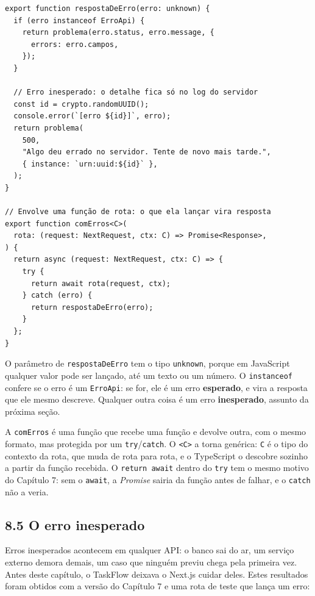 \begin{codigo}
\begin{Verbatim}[breaklines=true, breaksymbolleft={}, fontsize=\footnotesize]
export function respostaDeErro(erro: unknown) {
  if (erro instanceof ErroApi) {
    return problema(erro.status, erro.message, {
      errors: erro.campos,
    });
  }

  // Erro inesperado: o detalhe fica só no log do servidor
  const id = crypto.randomUUID();
  console.error(`[erro ${id}]`, erro);
  return problema(
    500,
    "Algo deu errado no servidor. Tente de novo mais tarde.",
    { instance: `urn:uuid:${id}` },
  );
}

// Envolve uma função de rota: o que ela lançar vira resposta
export function comErros<C>(
  rota: (request: NextRequest, ctx: C) => Promise<Response>,
) {
  return async (request: NextRequest, ctx: C) => {
    try {
      return await rota(request, ctx);
    } catch (erro) {
      return respostaDeErro(erro);
    }
  };
}
\end{Verbatim}
\end{codigo}

O parâmetro de \texttt{respostaDeErro} tem o tipo \texttt{unknown}, porque em JavaScript qualquer valor pode ser lançado, até um texto ou um número. O \texttt{instanceof} confere se o erro é um \texttt{ErroApi}: se for, ele é um erro \textbf{esperado}, e vira a resposta que ele mesmo descreve. Qualquer outra coisa é um erro \textbf{inesperado}, assunto da próxima seção.

A \texttt{comErros} é uma função que recebe uma função e devolve outra, com o mesmo formato, mas protegida por um \texttt{try}/\texttt{catch}. O \texttt{<C>} a torna genérica: \texttt{C} é o tipo do contexto da rota, que muda de rota para rota, e o TypeScript o descobre sozinho a partir da função recebida. O \texttt{return await} dentro do \texttt{try} tem o mesmo motivo do Capítulo 7: sem o \texttt{await}, a \textit{Promise} sairia da função antes de falhar, e o \texttt{catch} não a veria.

\subsection{8.5 O erro inesperado}

Erros inesperados acontecem em qualquer API: o banco sai do ar, um serviço externo demora demais, um caso que ninguém previu chega pela primeira vez. Antes deste capítulo, o TaskFlow deixava o Next.js cuidar deles. Estes resultados foram obtidos com a versão do Capítulo 7 e uma rota de teste que lança um erro:

